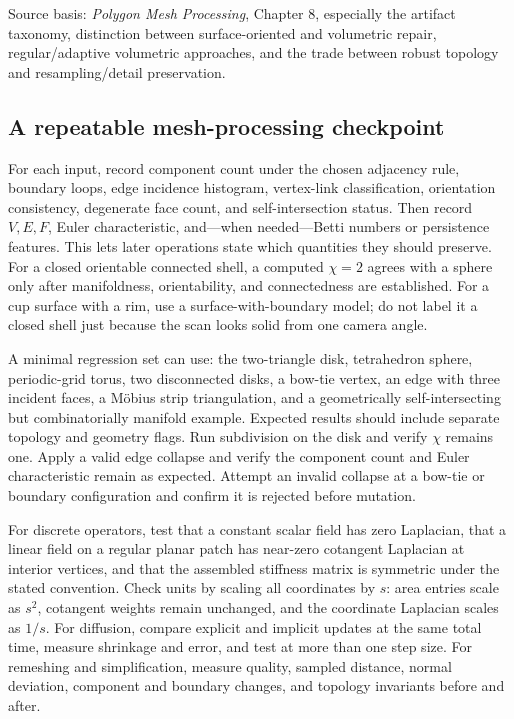 Source basis: \emph{Polygon Mesh Processing}, Chapter 8, especially the artifact taxonomy, distinction between surface-oriented and volumetric repair, regular/adaptive volumetric approaches, and the trade between robust topology and resampling/detail preservation.

\subsection{A repeatable mesh-processing checkpoint}\label{03-visual-computing-i-ch002-a-repeatable-mesh-processing-checkpoint}

For each input, record component count under the chosen adjacency rule, boundary loops, edge incidence histogram, vertex-link classification, orientation consistency, degenerate face count, and self-intersection status. Then record \(V,E,F\), Euler characteristic, and---when needed---Betti numbers or persistence features. This lets later operations state which quantities they should preserve. For a closed orientable connected shell, a computed \(\chi=2\) agrees with a sphere only after manifoldness, orientability, and connectedness are established. For a cup surface with a rim, use a surface-with-boundary model; do not label it a closed shell just because the scan looks solid from one camera angle.

A minimal regression set can use: the two-triangle disk, tetrahedron sphere, periodic-grid torus, two disconnected disks, a bow-tie vertex, an edge with three incident faces, a Möbius strip triangulation, and a geometrically self-intersecting but combinatorially manifold example. Expected results should include separate topology and geometry flags. Run subdivision on the disk and verify \(\chi\) remains one. Apply a valid edge collapse and verify the component count and Euler characteristic remain as expected. Attempt an invalid collapse at a bow-tie or boundary configuration and confirm it is rejected before mutation.

For discrete operators, test that a constant scalar field has zero Laplacian, that a linear field on a regular planar patch has near-zero cotangent Laplacian at interior vertices, and that the assembled stiffness matrix is symmetric under the stated convention. Check units by scaling all coordinates by \(s\): area entries scale as \(s^2\), cotangent weights remain unchanged, and the coordinate Laplacian scales as \(1/s\). For diffusion, compare explicit and implicit updates at the same total time, measure shrinkage and error, and test at more than one step size. For remeshing and simplification, measure quality, sampled distance, normal deviation, component and boundary changes, and topology invariants before and after.

